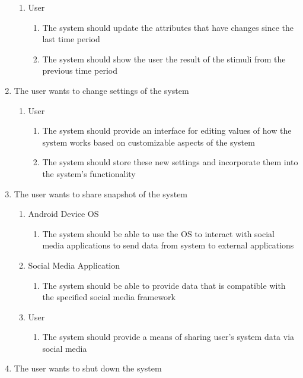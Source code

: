 \documentclass[]{article}
\begin{document}
\begin{enumerate}
	\begin{enumerate}
		\item User
			\begin{enumerate}
				\item The system should update the attributes that have changes since the last time period
				\item The system should show the user the result of the stimuli from the previous time period
			\end{enumerate}
	\end{enumerate}
	\item The user wants to change settings of the system
	\begin{enumerate}
		\item User
			\begin{enumerate}
				\item The system should provide an interface for editing values of how the system works based on customizable aspects of the system
				\item The system should store these new settings and incorporate them into the system’s functionality
			\end{enumerate}
	\end{enumerate}
	\item The user wants to share snapshot of the system
	\begin{enumerate}
		\item Android Device OS
			\begin{enumerate}
				\item The system should be able to use the OS to interact with social media applications to send data from system to external applications
			\end{enumerate}
		\item Social Media Application
			\begin{enumerate}
				\item The system should be able to provide data that is compatible with the specified social media framework
			\end{enumerate}
			\item User
			\begin{enumerate}
				\item The system should provide a means of sharing user’s system data via social media
			\end{enumerate}
	\end{enumerate}
	\item The user wants to shut down the system
	\begin{enumerate}

\end{enumerate}
\end{enumerate}
\end{document}
